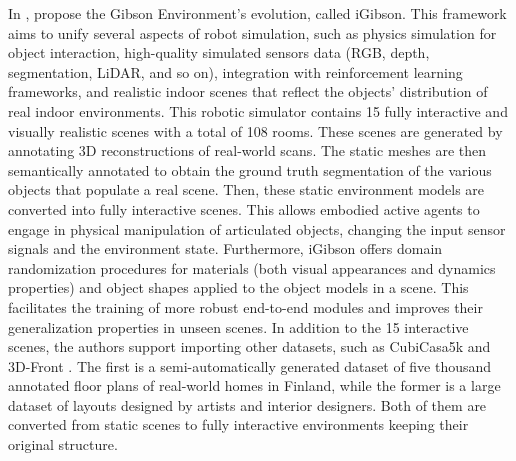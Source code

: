  In \cite{igibson}, \citeauthor{igibson} propose the Gibson Environment's evolution, called iGibson. This framework aims to unify several aspects of robot simulation, such as physics simulation for object interaction, high-quality simulated sensors data (RGB, depth, segmentation, LiDAR, and so on), integration with reinforcement learning frameworks, and realistic indoor scenes that reflect the objects' distribution of real indoor environments. This robotic simulator contains 15 fully interactive and visually realistic scenes with a total of 108 rooms. These scenes are generated  by annotating 3D reconstructions of real-world scans. The static meshes are then semantically annotated to obtain the ground truth segmentation of the various objects that populate a real scene. Then, these static environment models are converted into fully interactive scenes. This allows embodied active agents to engage in physical manipulation of articulated objects, changing the input sensor signals and the environment state. Furthermore, iGibson offers domain randomization procedures for materials (both visual appearances and dynamics properties) and object shapes applied to the object models in a scene. This facilitates the training of more robust end-to-end modules and improves their generalization properties in unseen scenes. In addition to the 15 interactive scenes, the authors support importing other datasets, such as CubiCasa5k \cite{cubicasa} and 3D-Front \cite{3dfront}. The first is a semi-automatically generated dataset of five thousand annotated floor plans of real-world homes in Finland, while the former is a large dataset of layouts designed by artists and interior designers. Both of them are converted from static scenes to fully interactive environments keeping their original structure. 
 

 